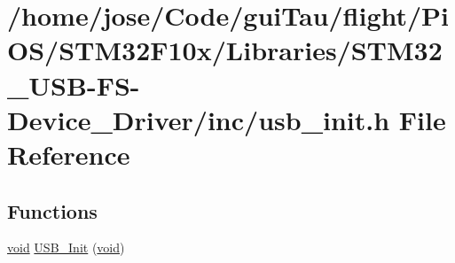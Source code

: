\hypertarget{_s_t_m32_f10x_2_libraries_2_s_t_m32___u_s_b-_f_s-_device___driver_2inc_2usb__init_8h}{\section{/home/jose/\-Code/gui\-Tau/flight/\-Pi\-O\-S/\-S\-T\-M32\-F10x/\-Libraries/\-S\-T\-M32\-\_\-\-U\-S\-B-\/\-F\-S-\/\-Device\-\_\-\-Driver/inc/usb\-\_\-init.h File Reference}
\label{_s_t_m32_f10x_2_libraries_2_s_t_m32___u_s_b-_f_s-_device___driver_2inc_2usb__init_8h}
}
\subsection*{Functions}
\begin{DoxyCompactItemize}
\item 
\hyperlink{group___n_a_m_e_ga18028b8badbf1ea7e704ccac3c488e82}{void} \hyperlink{_s_t_m32_f10x_2_libraries_2_s_t_m32___u_s_b-_f_s-_device___driver_2inc_2usb__init_8h_a35fe971cbcbfe8813199e869284cb862}{U\-S\-B\-\_\-\-Init} (\hyperlink{group___n_a_m_e_ga18028b8badbf1ea7e704ccac3c488e82}{void})
\end{DoxyCompactItemize}
